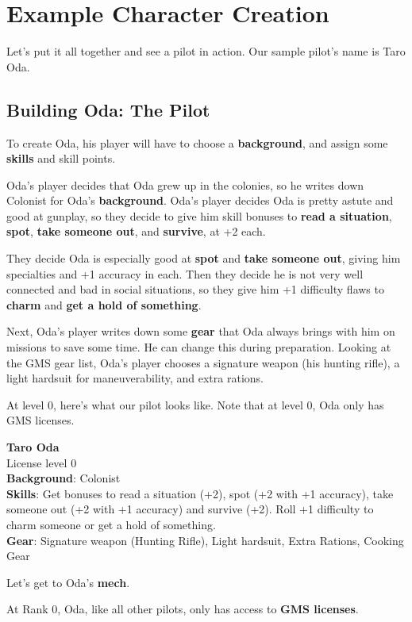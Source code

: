 \section{Example Character Creation}


Let’s put it all together and see a pilot in action. Our sample pilot’s name is Taro Oda.

\subsection{Building Oda: The Pilot}

To create Oda, his player will have to choose a \textbf{background}, and assign some \textbf{skills} and skill points.


Oda’s player decides that Oda grew up in the colonies, so he writes down Colonist for Oda’s \textbf{background}. Oda’s player decides Oda is pretty astute and good at gunplay, so they decide to give him skill bonuses to \textbf{read a situation}, \textbf{spot}, \textbf{take someone out}, and \textbf{survive}, at +2 each.

They decide Oda is especially good at \textbf{spot} and \textbf{take someone out}, giving him specialties and +1 accuracy in each. Then they decide he is not very well connected and bad in social situations, so they give him +1 difficulty flaws to \textbf{charm} and \textbf{get a hold of something}.

Next, Oda’s player writes down some \textbf{gear} that Oda always brings with him on missions to save some time. He can change this during preparation. Looking at the GMS gear list, Oda’s player chooses a signature weapon (his hunting rifle), a light hardsuit for maneuverability, and extra rations.

At level 0, here’s what our pilot looks like. Note that at level 0, Oda only has GMS licenses.

\textbf{Taro Oda}\\
License level 0\\
\textbf{Background}: Colonist\\
\textbf{Skills}: Get bonuses to read a situation (+2), spot (+2 with +1 accuracy), take someone out (+2 with +1 accuracy) and survive (+2). Roll +1 difficulty to charm someone or get a hold of something.\\
\textbf{Gear}: Signature weapon (Hunting Rifle), Light hardsuit, Extra Rations, Cooking Gear

Let’s get to Oda’s \textbf{mech}.

At Rank 0, Oda, like all other pilots, only has access to \textbf{GMS licenses}.

